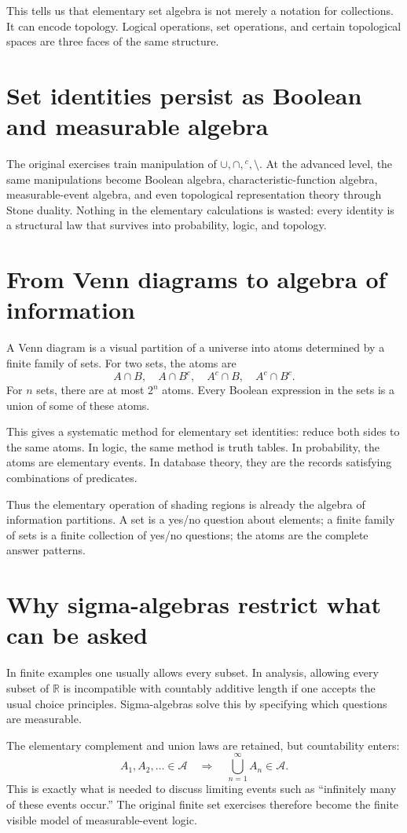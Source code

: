 This tells us that elementary set algebra is not merely a notation for collections.  It can encode topology.  Logical operations, set operations, and certain topological spaces are three faces of the same structure.

\section{Set identities persist as Boolean and measurable algebra}

The original exercises train manipulation of $\cup,\cap,{}^c,\setminus$.  At the advanced level, the same manipulations become Boolean algebra, characteristic-function algebra, measurable-event algebra, and even topological representation theory through Stone duality.  Nothing in the elementary calculations is wasted: every identity is a structural law that survives into probability, logic, and topology.

\section{From Venn diagrams to algebra of information}

A Venn diagram is a visual partition of a universe into atoms determined by a finite family of sets.  For two sets, the atoms are
\[
  A\cap B,\quad A\cap B^c,\quad A^c\cap B,\quad A^c\cap B^c.
\]
For $n$ sets, there are at most $2^n$ atoms.  Every Boolean expression in the sets is a union of some of these atoms.

This gives a systematic method for elementary set identities: reduce both sides to the same atoms.  In logic, the same method is truth tables.  In probability, the atoms are elementary events.  In database theory, they are the records satisfying combinations of predicates.

Thus the elementary operation of shading regions is already the algebra of information partitions.  A set is a yes/no question about elements; a finite family of sets is a finite collection of yes/no questions; the atoms are the complete answer patterns.

\section{Why sigma-algebras restrict what can be asked}

In finite examples one usually allows every subset.  In analysis, allowing every subset of $\mathbb R$ is incompatible with countably additive length if one accepts the usual choice principles.  Sigma-algebras solve this by specifying which questions are measurable.

The elementary complement and union laws are retained, but countability enters:
\[
  A_1,A_2,\ldots\in\mathcal A
  \quad\Longrightarrow\quad
  \bigcup_{n=1}^{\infty}A_n\in\mathcal A.
\]
This is exactly what is needed to discuss limiting events such as ``infinitely many of these events occur.''  The original finite set exercises therefore become the finite visible model of measurable-event logic.

